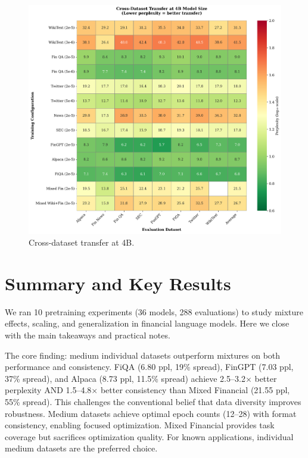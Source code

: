 \begin{figure}[htbp]
\centering
\includegraphics[width=\textwidth]{figures/heatmap_transfer.png}
\caption[Cross-Dataset Transfer at 4B]{Cross-dataset transfer at 4B.}
\label{fig:heatmap_transfer}
\end{figure}


















\section{Summary and Key Results}

We ran 10 pretraining experiments (36 models, 288 evaluations) to study mixture effects, scaling, and generalization in financial language models. Here we close with the main takeaways and practical notes.

The core finding: medium individual datasets outperform mixtures on both performance and consistency. FiQA (6.80 ppl, 19\% spread), FinGPT (7.03 ppl, 37\% spread), and Alpaca (8.73 ppl, 11.5\% spread) achieve 2.5–3.2$\times$ better perplexity AND 1.5–4.8$\times$ better consistency than Mixed Financial (21.55 ppl, 55\% spread). This challenges the conventional belief that data diversity improves robustness. Medium datasets achieve optimal epoch counts (12–28) with format consistency, enabling focused optimization. Mixed Financial provides task coverage but sacrifices optimization quality. For known applications, individual medium datasets are the preferred choice.
